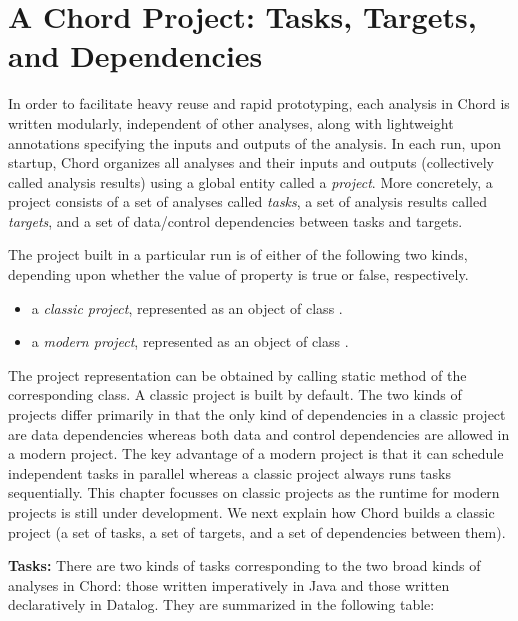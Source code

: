 \chapter{A Chord Project: Tasks, Targets, and Dependencies}
\label{chap:project}

In order to facilitate heavy reuse and rapid prototyping, each analysis in Chord is
written modularly, independent of other analyses, along with lightweight annotations
specifying the inputs and outputs of the analysis.
In each run, upon startup, Chord organizes all analyses and their inputs and outputs
(collectively called analysis results) using a global entity
called a {\it project}.  More concretely, a project consists of a set of
analyses called {\it tasks}, a set of analysis results called {\it targets}, and
a set of data/control dependencies between tasks and targets.

The project built in a particular run is of either of the following two kinds,
depending upon whether the value of property  is true or false, respectively.
\begin{itemize}
\item
a {\it classic project}, represented as an object of
class .
\item
a {\it modern project}, represented as an object of
class .
\end{itemize}
The project representation can be obtained by calling static method  of the
corresponding class.
A classic project is built by default.
The two kinds of projects differ
primarily in that the only kind of dependencies in a classic
project are data dependencies whereas both data and control dependencies are
allowed in a modern project.  The key advantage of a modern project is that it
can schedule independent tasks in parallel whereas a classic project always
runs tasks sequentially.  This chapter focusses on classic projects as the
runtime for modern projects is still under development.
We next explain how Chord builds a classic project
(a set of tasks, a set of targets, and a set of dependencies between them).

{\bf Tasks:}
There are two kinds of tasks corresponding to the two broad kinds of analyses in
Chord: those written imperatively in Java and those written declaratively in
Datalog.  They are summarized in the following table:

